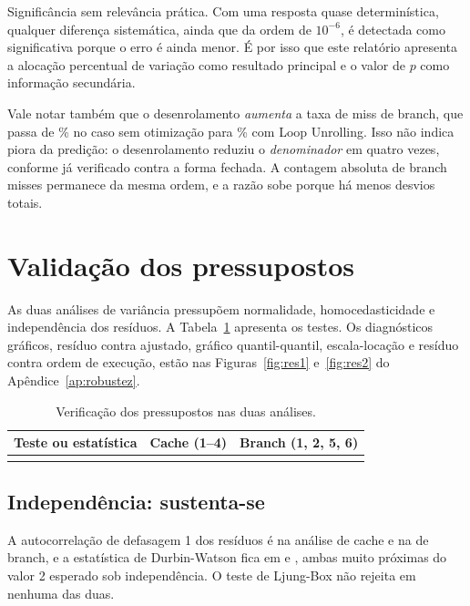 \documentclass[11pt,a4paper]{article}
\begin{document}
Significância sem relevância prática. Com uma resposta quase determinística, qualquer
diferença sistemática, ainda que da ordem de $10^{-6}$, é detectada como significativa
porque o erro é ainda menor. É por isso que este relatório apresenta a alocação percentual
de variação como resultado principal e o valor de $p$ como informação secundária.

Vale notar também que o desenrolamento \emph{aumenta} a taxa de miss de branch, que
passa de \valTaxaBrBase\% no caso sem otimização para \valTaxaBrUnroll\% com Loop
Unrolling. Isso não indica piora da predição: o desenrolamento
reduziu o \emph{denominador} em quatro vezes, conforme já verificado contra a forma
fechada. A contagem absoluta de branch misses permanece da mesma ordem, e a razão sobe
porque há menos desvios totais.

\section{Validação dos pressupostos}
\label{sec:pressupostos}

As duas análises de variância pressupõem normalidade, homocedasticidade e independência
dos resíduos. A Tabela~\ref{tab:pressupostos} apresenta os testes. Os diagnósticos
gráficos, resíduo contra ajustado, gráfico quantil-quantil, escala-locação e resíduo contra
ordem de execução, estão nas Figuras~\ref{fig:res1} e~\ref{fig:res2} do
Apêndice~\ref{ap:robustez}.

\begin{table}[H]
\centering
\caption{Verificação dos pressupostos nas duas análises.}
\label{tab:pressupostos}
\small
\begin{tabular}{@{}lrr@{}}
\toprule
\textbf{Teste ou estatística} & \textbf{Cache (1--4)} & \textbf{Branch (1, 2, 5, 6)} \\
\midrule
\\
\bottomrule
\end{tabular}
\end{table}


\subsection{Independência: sustenta-se}

A autocorrelação de defasagem 1 dos resíduos é \valFatUmAc{} na análise de cache e
\valFatDoisAc{} na de branch, e a estatística de Durbin-Watson fica em \valFatUmDw{} e
\valFatDoisDw, ambas muito próximas do valor 2 esperado sob independência. O teste de
Ljung-Box não rejeita em nenhuma das duas.
\end{document}
